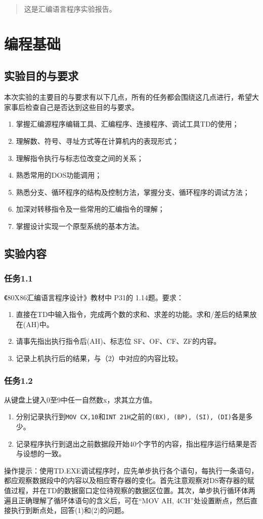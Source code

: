 \documentclass{ctexrep}
\begin{document}
\begin{abstract}
    这是汇编语言程序实验报告。
    
\end{abstract}
\tableofcontents

\chapter{编程基础}
\section{实验目的与要求}
本次实验的主要目的与要求有以下几点，所有的任务都会围绕这几点进行，希望大家事后检查自己是否达到这些目的与要求。
\begin{enumerate}
    \item 掌握汇编源程序编辑工具、汇编程序、连接程序、调试工具TD的使用；
    \item 理解数、符号、寻址方式等在计算机内的表现形式；
    \item 理解指令执行与标志位改变之间的关系；
    \item 熟悉常用的DOS功能调用；
    \item 熟悉分支、循环程序的结构及控制方法，掌握分支、循环程序的调试方法；
    \item 加深对转移指令及一些常用的汇编指令的理解；
    \item 掌握设计实现一个原型系统的基本方法。
\end{enumerate}
\section{实验内容}
\subsection{任务1.1}
《80X86汇编语言程序设计》教材中 P31的 1.14题。要求：
\begin{enumerate}
    \item 直接在TD中输入指令，完成两个数的求和、求差的功能。求和/差后的结果放在(AH)中。
    \item 请事先指出执行指令后(AH)、标志位 SF、OF、CF、ZF的内容。
    \item 记录上机执行后的结果，与（2）中对应的内容比较。
\end{enumerate}
\subsection{任务1.2}
从键盘上键入0至9中任一自然数x，求其立方值。
\begin{enumerate}
    \item 分别记录执行到\texttt{MOV  CX,10}和\texttt{INT 21H}之前的\texttt{(BX), (BP), (SI), (DI)}各是多少。
    \item 记录程序执行到退出之前数据段开始40个字节的内容，指出程序运行结果是否与设想的一致。
\end{enumerate}
操作提示：使用TD.EXE调试程序时，应先单步执行各个语句，每执行一条语句，都应观察数据段中的内容以及相应寄存器的变化。首先注意观察对DS寄存器的赋值过程，并在TD的数据窗口定位待观察的数据区位置。其次，单步执行循环体两遍且正确理解了循环体语句的含义后，可在“MOV AH, 4CH”处设置断点，然后直接执行到断点处，回答(1)和(2)的问题。
\end{document}
